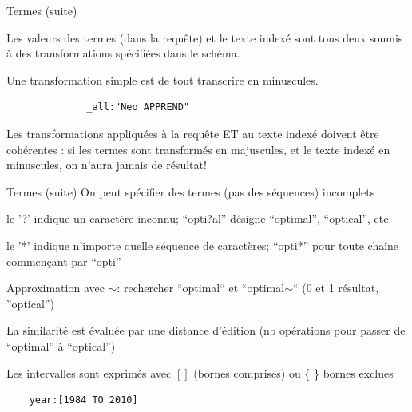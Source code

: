 \begin{frame}[fragile]{Termes (suite)}

  \begin{redbullet}
    \item Les valeurs des termes (dans la requête) et le texte indexé sont tous deux
soumis à des transformations spécifiées dans le schéma. 
\item Une transformation simple est de tout transcrire en minuscules. 
\begin{verbatim}
              _all:"Neo APPREND"
\end{verbatim}
\item  Les transformations appliquées à la requête ET au texte indexé doivent être 
   cohérentes : si les termes sont transformés en majuscules, et le texte indexé en minuscules,
   on n'aura jamais de résultat!
  \end{redbullet}
\end{frame}

\begin{frame}[fragile]{Termes (suite)}
  On peut spécifier des termes (pas des séquences) incomplets
  \begin{redbullet}
      \setlength{\itemsep}{8pt}
    \item le '?' indique un caractère inconnu;  ``opti?al'' désigne ``optimal'', ``optical'', etc.
      
    \item le '*' indique n'importe quelle séquence de caractères; 
      ``opti*'' pour toute chaîne commençant par ``opti''
    \item Approximation avec $\sim$: rechercher ``optimal`` et ``optimal$\sim$`` (0 et 1 résultat, ''optical'')
    
       La similarité est évaluée par une distance d'édition 
      (nb opérations pour passer de ``optimal'' à ``optical'')
  
    \item Les intervalles sont exprimés avec  $[ ]$ (bornes comprises) ou  \{ \} bornes exclues
  \end{redbullet}
\begin{verbatim}
    year:[1984 TO 2010]
\end{verbatim}
\end{frame}

